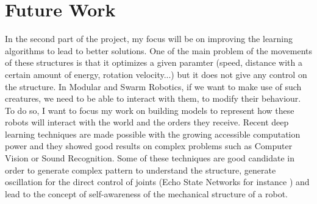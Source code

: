 
\chapter{Future Work} %

\label{Chapter 5} %


In the second part of the project, my focus will be on improving the learning algorithms to lead to better solutions. One of the main problem of the movements of these structures is that it optimizes a given paramter (speed, distance with a certain amount of energy, rotation velocity...) but it does not give any control on the structure. In Modular and Swarm Robotics, if we want to make use of such creatures, we need to be able to interact with them, to modify their behaviour. To do so, I want to focus my work on building models to represent how these robots will interact with the world and the orders they receive. Recent deep learning techniques are made possible with the growing accessible computation power and they showed good results on complex problems such as Computer Vision or Sound Recognition. Some of these techniques are good candidate in order to generate complex pattern to understand the structure, generate oscillation for the direct control of joints (Echo State Networks for instance \cite{jaeger2007echo}) and lead to the concept of self-awareness of the mechanical structure of a robot. 

